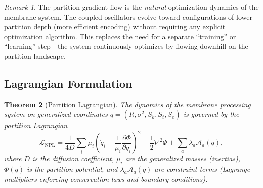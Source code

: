\documentclass[twocolumn,10pt]{article}
\newtheorem{theorem}{Theorem}[section]
\theoremstyle{remark}
\newtheorem{remark}[theorem]{Remark}
\newcommand{\Sk}{S_k}
\newcommand{\St}{S_t}
\newcommand{\Se}{S_e}
\newcommand{\NPL}{\mathcal{L}_{\mathrm{NPL}}}
\begin{document}
\begin{remark}
The partition gradient flow is the \emph{natural} optimization dynamics of the membrane system. The coupled oscillators evolve toward configurations of lower partition depth (more efficient encoding) without requiring any explicit optimization algorithm. This replaces the need for a separate ``training'' or ``learning'' step---the system continuously optimizes by flowing downhill on the partition landscape.
\end{remark}

\subsection{Lagrangian Formulation}

\begin{theorem}[Partition Lagrangian]
\label{thm:lagrangian}
The dynamics of the membrane processing system on generalized coordinates $q = (R, \sigma^2, \Sk, \St, \Se)$ is governed by the partition Lagrangian
\begin{equation}
\NPL = \frac{1}{4D}\sum_i \mu_i \!\left(\dot{q}_i + \frac{1}{\mu_i}\frac{\partial\Phi}{\partial q_i}\right)^{\!2} - \frac{1}{2}\nabla^2\Phi + \sum_a \lambda_a \mathcal{A}_a(q),
\label{eq:lagrangian}
\end{equation}
where $D$ is the diffusion coefficient, $\mu_i$ are the generalized masses (inertias), $\Phi(q)$ is the partition potential, and $\lambda_a \mathcal{A}_a(q)$ are constraint terms (Lagrange multipliers enforcing conservation laws and boundary conditions).
\end{theorem}
\end{document}
